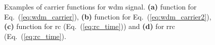 \begin{figure}[tpb]
    \begin{minipage}[h]{0.3\linewidth}
    \end{minipage}
    \hfill
    \begin{minipage}[h]{0.55\linewidth}
    \end{minipage}
    \caption{Examples of carrier functions for \acrshort{wdm} signal. \textbf{(a)} function for Eq.~(\ref{eq:wdm_carrier}), \textbf{(b)} function for Eq.~(\ref{eq:wdm_carrier2}), \textbf{(c)} function for \gls{rc} (Eq.~(\ref{eq:rc_time})) and \textbf{(d)} for \gls{rrc} (Eq.~(\ref{eq:rc_time}).}
    \label{fig:f_shapes}
\end{figure}


